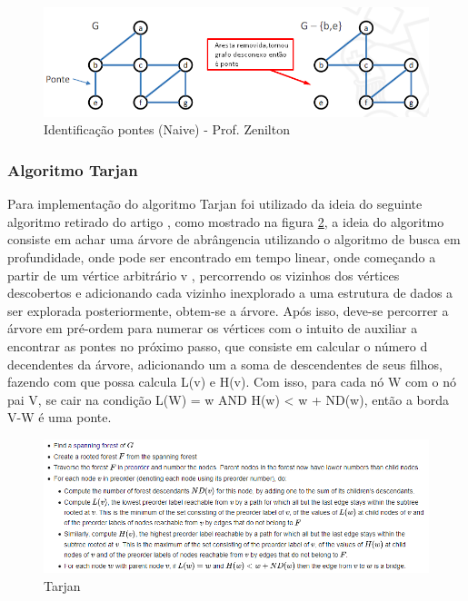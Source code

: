 \newpage
\begin{figure}[ht]
    \centering
    \includegraphics[width=.9\textwidth]{figuras/naive.png}
    \caption{Identificação pontes (Naive) - Prof. Zenilton}
    \label{fig:figure6}
\end{figure}

\subsubsection{\esp Algoritmo Tarjan}
Para implementação do algoritmo Tarjan foi utilizado da ideia do seguinte algoritmo retirado do artigo \cite{tarjan}, como mostrado na figura \ref{fig:figure9}, a ideia do algoritmo consiste em achar uma árvore de abrângencia \cite{spanning} utilizando o algoritmo de busca em profundidade, onde pode ser encontrado em tempo linear, onde começando a partir de um vértice arbitrário v , percorrendo os vizinhos dos vértices descobertos e adicionando cada vizinho inexplorado a uma estrutura de dados a ser explorada posteriormente, obtem-se a árvore. Após isso, deve-se percorrer a árvore em pré-ordem \cite{tree_traversal} para numerar os vértices com o intuito de auxiliar a encontrar as pontes no próximo passo, que consiste em calcular o número d decendentes da árvore, adicionando um a soma de descendentes de seus filhos, fazendo com que possa calcula L(v) e H(v). Com isso, para cada nó W com o nó pai V, se cair na condição L(W) = w AND H(w) < w + ND(w), então a borda V-W é uma ponte.

\begin{figure}[ht]
    \centering
    \includegraphics[width=.9\textwidth]{figuras/tarjan algorithm.png}
    \caption{Tarjan \cite{Bridge_tarjan}}
    \label{fig:figure9}
\end{figure}

